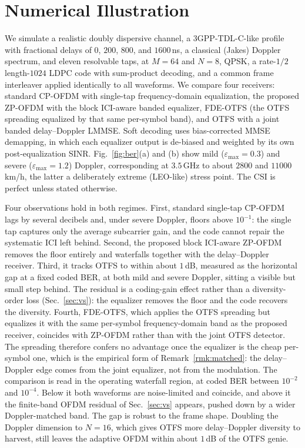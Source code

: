 \documentclass[onecolumn,journal]{IEEEtran}
\theoremstyle{bfhead}
\begin{document}
\section{Numerical Illustration}
\label{sec:num}
We simulate a realistic doubly dispersive channel, a 3GPP-TDL-C-like profile with
fractional delays of $0$, $200$, $800$, and $1600$\,ns, a classical (Jakes)
Doppler spectrum, and eleven resolvable taps, at $M{=}64$ and $N{=}8$, QPSK, a
rate-$1/2$ length-$1024$
LDPC code with sum-product decoding, and a common frame interleaver applied
identically to all waveforms. We compare four receivers: standard CP-OFDM with
single-tap frequency-domain equalization, the proposed ZP-OFDM with the block
ICI-aware banded equalizer, FDE-OTFS (the OTFS spreading equalized by that same
per-symbol band), and OTFS with a joint banded delay--Doppler LMMSE.
Soft decoding uses bias-corrected MMSE demapping, in which each equalizer output
is de-biased and weighted by its own post-equalization SINR.
Fig.~\ref{fig:ber}(a) and (b) show mild ($\varepsilon_{\max}{=}0.3$) and severe
($\varepsilon_{\max}{=}1.2$) Doppler, corresponding at $3.5$\,GHz to about
$2800$ and $11000$\,km/h, the latter a deliberately extreme (LEO-like) stress
point. The CSI is perfect unless stated otherwise.

Four observations hold in both regimes. First, standard single-tap CP-OFDM lags
by several decibels and, under severe Doppler, floors above $10^{-1}$: the single
tap captures only the average subcarrier gain, and the code cannot repair the
systematic ICI left behind. Second, the proposed block ICI-aware ZP-OFDM removes
the floor entirely and waterfalls together with the delay--Doppler receiver.
Third, it tracks OTFS to within about $1$\,dB, measured as the horizontal gap at a
fixed coded BER, at both mild and severe Doppler, sitting a visible but small step
behind. The residual is a coding-gain effect rather than a diversity-order loss
(Sec.~\ref{sec:vs}): the equalizer removes the floor and the code recovers the
diversity. Fourth, FDE-OTFS, which applies the OTFS spreading but equalizes it
with the same per-symbol frequency-domain band as the proposed receiver,
coincides with ZP-OFDM rather than with the joint OTFS detector. The spreading
therefore confers no advantage once the equalizer is the cheap per-symbol one,
which is the empirical form of Remark~\ref{rmk:matched}: the delay--Doppler edge
comes from the joint equalizer, not from the modulation. The comparison is read in
the operating waterfall region, at coded BER between $10^{-2}$ and $10^{-4}$.
Below it both waveforms are noise-limited and coincide, and above it the
finite-band OFDM residual of Sec.~\ref{sec:vs} appears, pushed down by a wider
Doppler-matched band. The gap is robust to the frame shape. Doubling the Doppler
dimension to $N{=}16$, which gives OTFS more delay--Doppler diversity to harvest,
still leaves the adaptive OFDM within about $1$\,dB of the OTFS genie.
\end{document}
